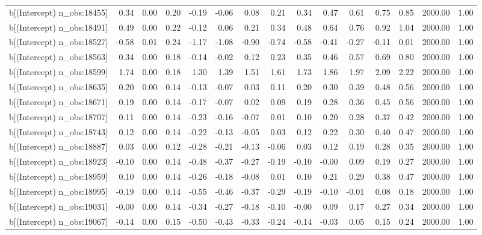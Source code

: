 \begin{table}[ht]
\begin{tabular}{rrrrrrrrrrrrrrr}
  b[(Intercept) n\_obs:18455] & 0.34 & 0.00 & 0.20 & -0.19 & -0.06 & 0.08 & 0.21 & 0.34 & 0.47 & 0.61 & 0.75 & 0.85 & 2000.00 & 1.00 \\ 
  b[(Intercept) n\_obs:18491] & 0.49 & 0.00 & 0.22 & -0.12 & 0.06 & 0.21 & 0.34 & 0.48 & 0.64 & 0.76 & 0.92 & 1.04 & 2000.00 & 1.00 \\ 
  b[(Intercept) n\_obs:18527] & -0.58 & 0.01 & 0.24 & -1.17 & -1.08 & -0.90 & -0.74 & -0.58 & -0.41 & -0.27 & -0.11 & 0.01 & 2000.00 & 1.00 \\ 
  b[(Intercept) n\_obs:18563] & 0.34 & 0.00 & 0.18 & -0.14 & -0.02 & 0.12 & 0.23 & 0.35 & 0.46 & 0.57 & 0.69 & 0.80 & 2000.00 & 1.00 \\ 
  b[(Intercept) n\_obs:18599] & 1.74 & 0.00 & 0.18 & 1.30 & 1.39 & 1.51 & 1.61 & 1.73 & 1.86 & 1.97 & 2.09 & 2.22 & 2000.00 & 1.00 \\ 
  b[(Intercept) n\_obs:18635] & 0.20 & 0.00 & 0.14 & -0.13 & -0.07 & 0.03 & 0.11 & 0.20 & 0.30 & 0.39 & 0.48 & 0.56 & 2000.00 & 1.00 \\ 
  b[(Intercept) n\_obs:18671] & 0.19 & 0.00 & 0.14 & -0.17 & -0.07 & 0.02 & 0.09 & 0.19 & 0.28 & 0.36 & 0.45 & 0.56 & 2000.00 & 1.00 \\ 
  b[(Intercept) n\_obs:18707] & 0.11 & 0.00 & 0.14 & -0.23 & -0.16 & -0.07 & 0.01 & 0.10 & 0.20 & 0.28 & 0.37 & 0.42 & 2000.00 & 1.00 \\ 
  b[(Intercept) n\_obs:18743] & 0.12 & 0.00 & 0.14 & -0.22 & -0.13 & -0.05 & 0.03 & 0.12 & 0.22 & 0.30 & 0.40 & 0.47 & 2000.00 & 1.00 \\ 
  b[(Intercept) n\_obs:18887] & 0.03 & 0.00 & 0.12 & -0.28 & -0.21 & -0.13 & -0.06 & 0.03 & 0.12 & 0.19 & 0.28 & 0.35 & 2000.00 & 1.00 \\ 
  b[(Intercept) n\_obs:18923] & -0.10 & 0.00 & 0.14 & -0.48 & -0.37 & -0.27 & -0.19 & -0.10 & -0.00 & 0.09 & 0.19 & 0.27 & 2000.00 & 1.00 \\ 
  b[(Intercept) n\_obs:18959] & 0.10 & 0.00 & 0.14 & -0.26 & -0.18 & -0.08 & 0.01 & 0.10 & 0.21 & 0.29 & 0.38 & 0.47 & 2000.00 & 1.00 \\ 
  b[(Intercept) n\_obs:18995] & -0.19 & 0.00 & 0.14 & -0.55 & -0.46 & -0.37 & -0.29 & -0.19 & -0.10 & -0.01 & 0.08 & 0.18 & 2000.00 & 1.00 \\ 
  b[(Intercept) n\_obs:19031] & -0.00 & 0.00 & 0.14 & -0.34 & -0.27 & -0.18 & -0.10 & -0.00 & 0.09 & 0.17 & 0.27 & 0.34 & 2000.00 & 1.00 \\ 
  b[(Intercept) n\_obs:19067] & -0.14 & 0.00 & 0.15 & -0.50 & -0.43 & -0.33 & -0.24 & -0.14 & -0.03 & 0.05 & 0.15 & 0.24 & 2000.00 & 1.00 \\ 

\end{tabular}
\end{table}

